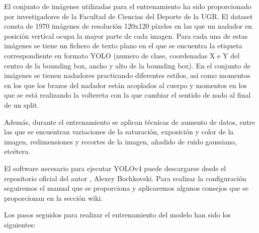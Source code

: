 El conjunto de imágenes utilizadas para el entrenamiento ha sido proporcionado por investigadores de la Facultad de Ciencias del Deporte de la UGR. El dataset consta de 1970 imágenes de resolución 120x120 píxeles en las que un nadador en posición vertical ocupa la mayor parte de cada imagen. Para cada una de estas imágenes se tiene un fichero de texto plano en el que se encuentra la etiqueta correspondiente en formato YOLO (numero de clase, coordenadas X e Y del centro de la bounding box, ancho y alto de la bounding box). En el conjunto de imágenes se tienen nadadores practicando diferentes estilos, así como momentos en los que los brazos del nadador están acoplados al cuerpo y momentos en los que se está realizando la voltereta con la que cambiar el sentido de nado al final de un split. 

Además, durante el entrenamiento se aplican técnicas de aumento de datos, entre las que se encuentran variaciones de la saturación, exposición y color de la imagen, redimensiones y recortes de la imagen, añadido de ruido gaussiano, etcétera. 

El software necesario para ejecutar YOLOv4 puede descargarse desde el repositorio oficial del autor \cite{darknetgithub}, Alexey Bochkovski. Para realizar la configuración seguiremos el manual que se proporciona y aplicaremos algunos consejos que se proporcionan en la sección wiki.

Los pasos seguidos para realizar el entrenamiento del modelo han sido los siguientes:

